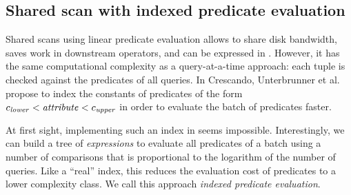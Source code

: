 


\subsection{Shared scan with indexed predicate evaluation}
\label{sec:indexed-predicate-evaluation}

Shared scans using linear predicate evaluation
allows to share disk bandwidth,
saves work in downstream operators,
and can be expressed in \sql.
However, it has the same computational complexity
as a query-at-a-time approach:
each tuple is checked against the predicates of all queries.
In Crescando, Unterbrunner et al.~\cite{Unterbrunner:2009:PPU:1687627.1687707}
propose to index the constants of predicates
of the form $c_{\varname{lower}} < \varname{attribute} < c_{\varname{upper}}$
in order to evaluate the batch of predicates faster.

At first sight, implementing such an index in \sql seems impossible.
Interestingly, we can build a tree of \emph{expressions}
to evaluate all predicates of a batch
using a number of comparisons
that is proportional to the logarithm of the number of queries.
Like a ``real'' index, this reduces the evaluation cost of predicates
to a lower complexity class.
We call this approach \emph{indexed predicate evaluation}.

